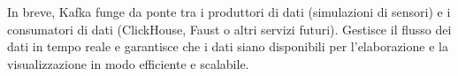 In breve, Kafka funge da ponte tra i produttori di dati (simulazioni di sensori) e i consumatori di dati (ClickHouse, Faust o altri servizi futuri). Gestisce il flusso dei dati in tempo reale e garantisce che i dati siano disponibili per l'elaborazione e la visualizzazione in modo efficiente e scalabile.